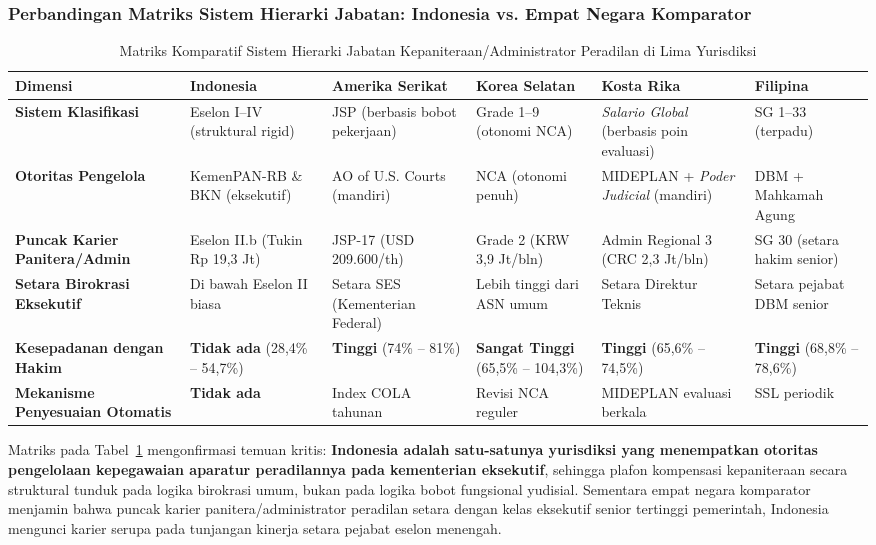 \documentclass[12pt, a4paper]{article}
\begin{document}
\subsubsection{Perbandingan Matriks Sistem Hierarki Jabatan: Indonesia vs. Empat Negara Komparator}

\begin{table}[H]
\centering
\fontsize{8}{10}\selectfont
\caption{Matriks Komparatif Sistem Hierarki Jabatan Kepaniteraan/Administrator Peradilan di Lima Yurisdiksi}
\label{tab:matriks-hierarki-komparatif}
\renewcommand{\arraystretch}{1.35}
\begin{tabular}{p{2.4cm} p{2.2cm} p{2.2cm} p{2.2cm} p{2.2cm} p{2.2cm}}
\hline
\textbf{Dimensi} & \textbf{Indonesia} & \textbf{Amerika Serikat} & \textbf{Korea Selatan} & \textbf{Kosta Rika} & \textbf{Filipina} \tabularnewline
\hline
\raggedright\textbf{Sistem Klasifikasi} & Eselon I--IV (struktural rigid) & JSP (berbasis bobot pekerjaan) & Grade 1--9 (otonomi NCA) & \textit{Salario Global} (berbasis poin evaluasi) & SG 1--33 (terpadu) \tabularnewline
\raggedright\textbf{Otoritas Pengelola} & KemenPAN-RB \& BKN (eksekutif) & AO of U.S. Courts (mandiri) & NCA (otonomi penuh) & MIDEPLAN + \textit{Poder Judicial} (mandiri) & DBM + Mahkamah Agung \tabularnewline
\raggedright\textbf{Puncak Karier Panitera/Admin} & Eselon II.b (Tukin Rp 19,3 Jt) & JSP-17 (USD 209.600/th) & Grade 2 (KRW 3,9 Jt/bln) & Admin Regional 3 (CRC 2,3 Jt/bln) & SG 30 (setara hakim senior) \tabularnewline
\raggedright\textbf{Setara Birokrasi Eksekutif} & Di bawah Eselon II biasa & Setara SES (Kementerian Federal) & Lebih tinggi dari ASN umum & Setara Direktur Teknis & Setara pejabat DBM senior \tabularnewline
\raggedright\textbf{Kesepadanan dengan Hakim} & \textbf{Tidak ada} (28,4\% -- 54,7\%) & \textbf{Tinggi} (74\% -- 81\%) & \textbf{Sangat Tinggi} (65,5\% -- 104,3\%) & \textbf{Tinggi} (65,6\% -- 74,5\%) & \textbf{Tinggi} (68,8\% -- 78,6\%) \tabularnewline
\raggedright\textbf{Mekanisme Penyesuaian Otomatis} & \textbf{Tidak ada} & Index COLA tahunan & Revisi NCA reguler & MIDEPLAN evaluasi berkala & SSL periodik \tabularnewline
\hline
\end{tabular}
\end{table}

Matriks pada Tabel~\ref{tab:matriks-hierarki-komparatif} mengonfirmasi temuan kritis: \textbf{Indonesia adalah satu-satunya yurisdiksi yang menempatkan otoritas pengelolaan kepegawaian aparatur peradilannya pada kementerian eksekutif}, sehingga plafon kompensasi kepaniteraan secara struktural tunduk pada logika birokrasi umum, bukan pada logika bobot fungsional yudisial. Sementara empat negara komparator menjamin bahwa puncak karier panitera/administrator peradilan setara dengan kelas eksekutif senior tertinggi pemerintah, Indonesia mengunci karier serupa pada tunjangan kinerja setara pejabat eselon menengah.
\end{document}

